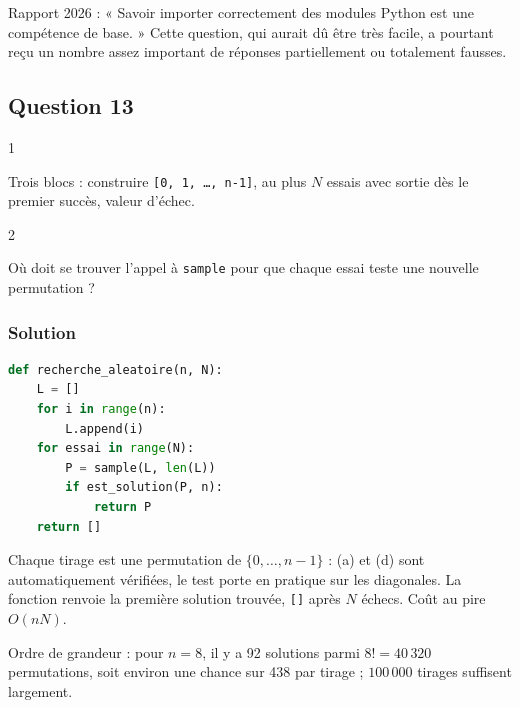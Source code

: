 \documentclass[11pt,a4paper]{article}
\begin{document}
\begin{jury}

Rapport 2026 : « Savoir importer correctement des modules Python est une compétence de base. » Cette question, qui aurait dû être très facile, a pourtant reçu un nombre assez important de réponses partiellement ou totalement fausses.

\end{jury}

\hypertarget{question-13}{%
\subsection{Question 13}\label{question-13}}

\begin{indication}{1}

Trois blocs : construire \texttt{{[}0,\ 1,\ …,\ n-1{]}}, au plus \(N\) essais avec sortie dès le premier succès, valeur d'échec.

\end{indication}

\begin{indication}{2}

Où doit se trouver l'appel à \texttt{sample} pour que chaque essai teste une nouvelle permutation ?

\end{indication}

\hypertarget{solution-12}{%
\subsubsection{Solution}\label{solution-12}}

\begin{lstlisting}[language=Python]
def recherche_aleatoire(n, N):
    L = []
    for i in range(n):
        L.append(i)
    for essai in range(N):
        P = sample(L, len(L))
        if est_solution(P, n):
            return P
    return []
\end{lstlisting}

Chaque tirage est une permutation de \(\{0, \dots, n-1\}\) : (a) et (d) sont automatiquement vérifiées, le test porte en pratique sur les diagonales. La fonction renvoie la première solution trouvée, \texttt{{[}{]}} après \(N\) échecs. Coût au pire \(O(nN)\).

Ordre de grandeur : pour \(n = 8\), il y a 92 solutions parmi \(8! = 40\,320\) permutations, soit environ une chance sur 438 par tirage ; \(100\,000\) tirages suffisent largement.
\end{document}
